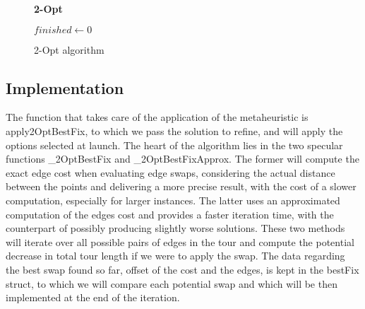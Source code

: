 \begin{figure}
    \textbf{2-Opt} \\
    \begin{algorithm}[H]
        \BlankLine
        $finished \gets 0$ \\
    \end{algorithm}
    \caption{2-Opt algorithm} \label{fig:2OptPseudocode}
\end{figure}

\subsection{Implementation}
The function that takes care of the application of the metaheuristic is apply2OptBestFix, to which we pass the solution to refine, and will apply the options selected at launch. 
The heart of the algorithm lies in the two specular functions \_2OptBestFix and \_2OptBestFixApprox.
The former will compute the exact edge cost when evaluating edge swaps, considering the actual distance between the points and delivering a more precise result, with the cost of a slower computation, especially for larger instances.
The latter uses an approximated computation of the edges cost and provides a faster iteration time, with the counterpart of possibly producing slightly worse solutions. 
These two methods will iterate over all possible pairs of edges in the tour and compute the potential decrease in total tour length if we were to apply the swap.
The data regarding the best swap found so far, offset of the cost and the edges, is kept in the bestFix struct, to which we will compare each potential swap and which will be then implemented at the end of the iteration.


